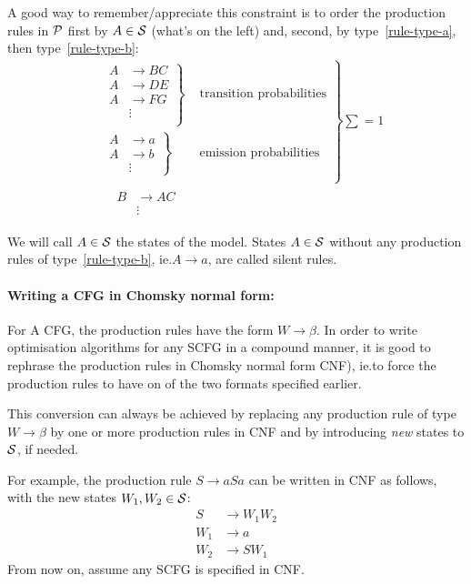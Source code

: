 A good way to remember/appreciate this constraint is to order the production
rules in \(\mathcal{P}\) first by \(A\in\mathcal{S}\) (what's on the left) and, second,
by type~\ref{rule-type-a}, then type~\ref{rule-type-b}:
\begin{align*}
&\left.
\begin{array}{cc}
  \left.
  \begin{array}{cc}
    A &\to BC \\
    A &\to DE \\
    A &\to FG \\
      &\vdots \\
  \end{array}\right\}& \text{ transition probabilities} \\
  \left.
  \begin{array}{cc}
    A &\to a \\
    A &\to b \\
      &\vdots
  \end{array}\right\}& \text{ emission probabilities} \\
\end{array}\right\} \sum = 1 \\
&\quad\begin{array}{cc}
  B &\to AC \\
    &\vdots
\end{array}
\end{align*}

We will call \(A\in\mathcal{S}\) the states of the model.  States \(A\in\mathcal{S}\)
without any production rules of type~\ref{rule-type-b}, ie.\@ \(A\to a\), are
called silent rules.

\paragraph{Writing a CFG in Chomsky normal form:}
For A CFG, the production rules have the form \(W\to\beta\).  In order to write
optimisation algorithms for any SCFG in a compound manner, it is good to
rephrase the production rules in Chomsky normal form CNF), ie.\@ to force the
production rules to have on of the two formats specified earlier.

This conversion can always be achieved by replacing any production rule of type
\(W\to\beta\) by one or more production rules in CNF and by introducing
\emph{new} states to \(\mathcal{S}\), if needed.

For example, the production rule \(S\to aSa\) can be written in CNF as follows,
with the new states \(W_1,W_2\in\mathcal{S}\):
\setcounter{equation}{0}
\begin{align}
  S   &\to W_1 W_2 \\
  W_1 &\to a \\
  W_2 &\to SW_1
\end{align}
From now on, assume any SCFG is specified in CNF\@.

